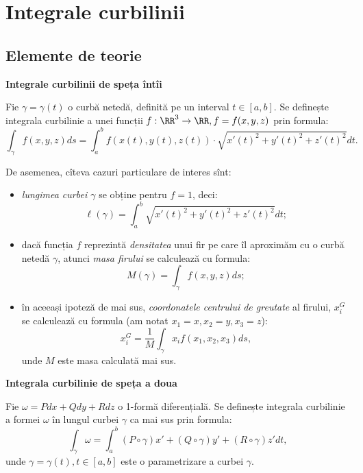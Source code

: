 
\chapter{Integrale curbilinii}

\section{Elemente de teorie}

\textbf{Integrale curbilinii de speța întîi}

Fie $ \gamma = \gamma(t) $ o curbă netedă, definită pe un interval 
$ t \in [a, b] $. Se definește integrala curbilinie a unei
funcții $ f : \RR^3 \to \RR, f = f(x, y, z) $ prin formula:
\[
    \int_\gamma f(x, y, z) ds = \int_a^b f(x(t), y(t), z(t)) \cdot %
    \sqrt{x'(t)^2 + y'(t)^2 + z'(t)^2} dt.
\]

De asemenea, cîteva cazuri particulare de interes sînt:
\begin{itemize}
    \item \emph{lungimea curbei $ \gamma $} se obține pentru $ f = 1 $,
        deci:
        \[
            \ell(\gamma) = \int_a^b \sqrt{x'(t)^2 + y'(t)^2 + z'(t)^2} dt;
        \]
    \item dacă funcția $ f $ reprezintă \emph{densitatea} unui fir pe care
        îl aproximăm cu o curbă netedă $ \gamma $, atunci \emph{masa firului}
        se calculează cu formula:
        \[
            M(\gamma) = \int_\gamma f(x,y,z) ds;
        \]
    \item în aceeași ipoteză de mai sus, \emph{coordonatele centrului de %
        greutate} al firului, $ x_i^G $ se calculează cu formula
        (am notat $ x_1 = x, x_2 = y, x_3 = z $):
        \[
            x_i^G = \dfrac{1}{M} \int_\gamma x_i f(x_1, x_2, x_3) ds,
        \]
        unde $ M $ este masa calculată mai sus.
\end{itemize}

\vspace{0.5cm}

\textbf{Integrala curbilinie de speța a doua}

Fie $ \omega = Pdx + Qdy + Rdz $ o 1-formă diferențială. Se definește
integrala curbilinie a formei $ \omega $ în lungul curbei $ \gamma $ ca mai sus
prin formula:
\[
    \int_\gamma \omega = \int_a^b (P \circ \gamma) x' + (Q \circ \gamma) y' + %
    (R \circ \gamma) z' dt,
\]
unde $ \gamma = \gamma(t), t \in [a, b] $ este o parametrizare a curbei $ \gamma $.



